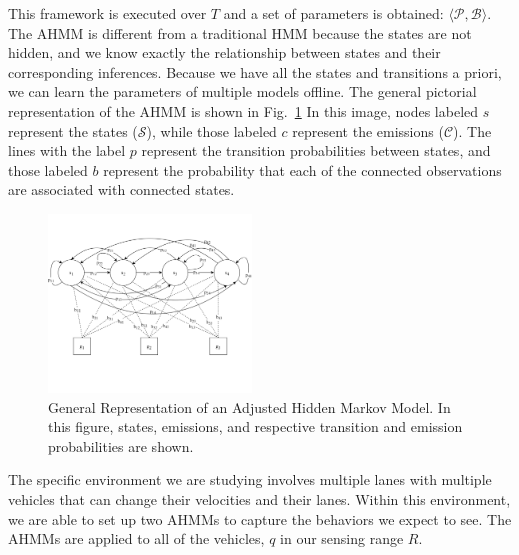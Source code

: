 \documentclass[letterpaper, 10 pt, conference]{ieeeconf}  %
\newcommand\NB[1]{$\spadesuit$\footnote{NB: #1}}
\begin{document}
This framework is executed over $T$ and a set of parameters is obtained: $\langle \mathcal{P}, \mathcal{B} \rangle$. The AHMM is different from a traditional HMM because the states are not hidden, and we know exactly the relationship
between states and their corresponding inferences. Because we have all the states and transitions a priori, we can learn the parameters of multiple models offline. %
The general pictorial representation of the AHMM is shown in Fig.~\ref{fig:hmm} %
In this image, nodes labeled $s$ represent the states ($\mathcal{S}$), while those labeled $c$ represent the emissions ($\mathcal{C}$). The lines with the label $p$ represent the transition probabilities between states, and those labeled $b$ represent the probability that each of the connected observations are associated with connected states.

\begin{figure}[ht!]
    \includegraphics[width=0.48\textwidth]{ahmm.png}
    \caption{General Representation of an Adjusted Hidden Markov Model. In this figure, states, emissions, and respective transition and emission probabilities are shown.}
    \label{fig:hmm}
\end{figure}

The specific environment we are studying involves multiple lanes with multiple vehicles that can change their velocities and their lanes. Within this environment, we are able to set up two AHMMs to capture the behaviors we expect to see. The AHMMs are applied to all of the vehicles, $q$ in our sensing range $R$.
\end{document}
